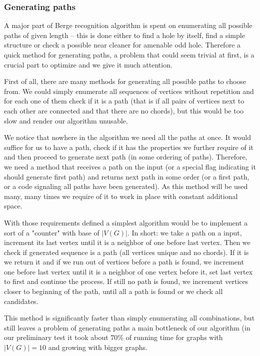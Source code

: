 \subsubsection{Generating paths}

A major part of Berge recognition algorithm is spent on enumerating all possible paths of given length -- this is done either to find a hole by itself, find a simple structure or check a possible near cleaner for amenable odd hole. Therefore a quick method for generating paths, a problem that could seem trivial at first, is a crucial part to optimize and we give it much attention.

First of all, there are many methods for generating all possible paths to choose from. We could simply enumerate all sequences of vertices without repetition and for each one of them check if it is a path (that is if all pairs of vertices next to each other are connected and that there are no chords), but this would be too slow and render our algorithm unusable.

We notice that nowhere in the algorithm we need all the paths at once. It would suffice for us to have a path, check if it has the properties we further require of it and then proceed to generate next path (in some ordering of paths). Therefore, we need a method that receives a path on the input (or a special flag indicating it should generate first path) and returns next path in some order (or a first path, or a code signaling all paths have been generated). As this method will be used many, many times we require of it to work in place with constant additional space.

With those requirements defined a simplest algorithm would be to implement a sort of a "counter" with base of $|V(G)|$. In short: we take a path on a input, increment its last vertex until it is a neighbor of one before last vertex. Then we check if generated sequence is a path (all vertices unique and no chords). If it is we return it and if we run out of vertices before a path is found, we increment one before last vertex until it is a neighbor of one vertex before it, set last vertex to first and continue the process. If still no path is found, we increment vertices closer to beginning of the path, until all a path is found or we check all candidates.

This method is significantly faster than simply enumerating all combinations, but still leaves a problem of generating paths a main bottleneck of our algorithm (in our preliminary test it took about 70\% of running time for graphs with $|V(G)| = 10$ and growing with bigger graphs. 

